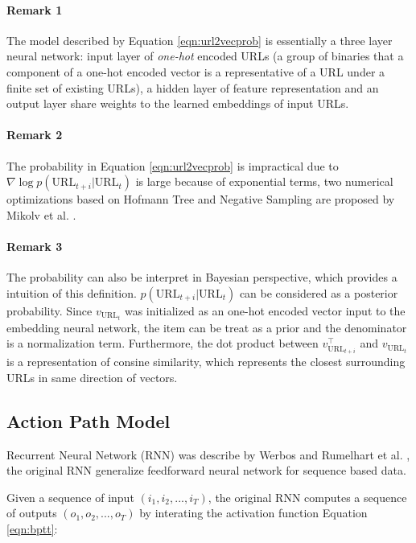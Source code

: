 \paragraph{Remark 1} The model described by Equation \ref{eqn:url2vecprob} is essentially
a three layer neural network: input layer of \emph{one-hot} encoded URLs (a group of binaries
that a component of a one-hot encoded vector is a representative of a URL under a finite set
of existing URLs), a hidden layer of feature representation and an output layer 
share weights to the learned embeddings of input URLs.

\paragraph{Remark 2} The probability in Equation \ref{eqn:url2vecprob} is impractical due to
$\nabla \log{p(\text{URL}_{t+i} | \text{URL}_t)}$ is large because of exponential terms,
two numerical optimizations based on Hofmann Tree and Negative Sampling are proposed 
by Mikolv et al. \cite{mikolv2013embedding}.

\paragraph{Remark 3} The probability can also be interpret in Bayesian perspective,
which provides a intuition of this definition. $p(\text{URL}_{t+i} | \text{URL}_t)$
can be considered as a posterior probability. Since $v_{\text{URL}_t}$ was initialized
as an one-hot encoded vector input to the embedding neural network, the item can be treat
as a prior and the denominator is a normalization term.
Furthermore, the dot product between $v_{\text{URL}_{t+i}} ^\top$
and $v_{\text{URL}_t}$ is a representation of consine similarity, which represents
the closest surrounding URLs in same direction of vectors.

\subsection{Action Path Model}

Recurrent Neural Network (RNN) was describe by Werbos \cite{werbos1990rnn} and 
Rumelhart et al. \cite{Rumelhart:1988:LRB:65669.104451}, the original RNN 
generalize feedforward neural network for sequence based data.

Given a sequence of input $(i_1, i_2, ..., i_T)$, the original RNN computes a
sequence of outputs $(o_1, o_2, ..., o_T)$ 
by interating the activation function Equation \ref{eqn:bptt}:

